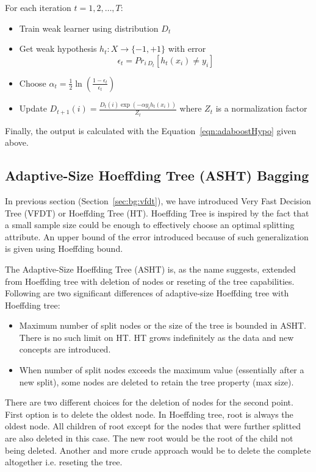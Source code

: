 \documentclass[a4paper, 11pt, oneside]{book}
\begin{document}
For each iteration $t= 1, 2, \dots, T$:
\begin{itemize}
    \item Train weak learner using distribution $D_t$
    \item Get weak hypothesis $h_t : X \rightarrow \{-1, +1\}$ with error
    \[
        \epsilon_t = Pr_{i ~ D_t} [h_t(x_i) \ne y_i]
    \]
    \item Choose $\alpha_t = \frac{1}{2} \ln \left( \frac{1 - \epsilon_t}{\epsilon_t} \right)$
    \item Update $D_{t+1} (i) = \frac{D_t(i) \exp(-\alpha y_i h_t(x_i))}{Z_t}$ where $Z_t$ is a normalization factor
\end{itemize}
Finally, the output is calculated with the Equation~\ref{eqn:adaboostHypo} given above.


\subsection{Adaptive-Size Hoeffding Tree (ASHT) Bagging}
In previous section (Section~\ref{sec:bg:vfdt}), we have introduced Very Fast Decision Tree (VFDT) or Hoeffding Tree (HT). Hoeffding Tree is inspired by the fact that a small sample size could be enough to effectively choose an optimal splitting attribute. An upper bound of the error introduced because of such generalization is given using Hoeffding bound.

The Adaptive-Size Hoeffding Tree (ASHT) is, as the name suggests, extended from Hoeffding tree with deletion of nodes or reseting of the tree capabilities. Following are two significant differences of adaptive-size Hoeffding tree with Hoeffding tree: 
\begin{itemize}
    \item Maximum number of split nodes or the size of the tree is bounded in ASHT. There is no such limit on HT. HT grows indefinitely as the data and new concepts are introduced.
    \item When number of split nodes exceeds the maximum value (essentially after a new split), some nodes are deleted to retain the tree property (max size).
\end{itemize}
There are two different choices for the deletion of nodes for the second point. First option is to delete the oldest node. In Hoeffding tree, root is always the oldest node. All children of root except for the nodes that were further splitted are also deleted in this case. The new root would be the root of the child not being deleted. Another and more crude approach would be to delete the complete altogether i.e. reseting the tree. 
\end{document}
